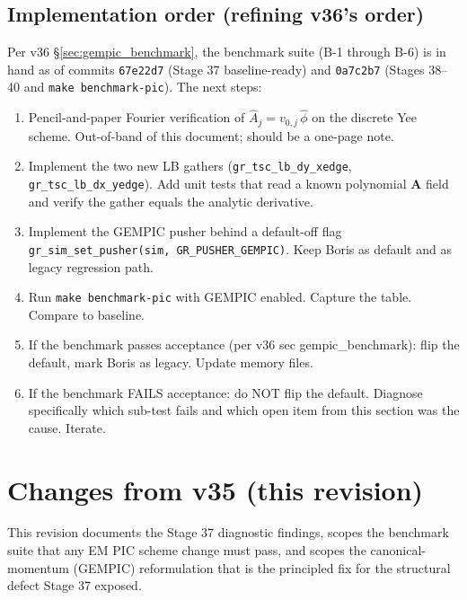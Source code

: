 \documentclass[11pt,a4paper]{article}
\newcommand{\vv}[1]{\mathbf{#1}}
\begin{document}
\subsection{Implementation order (refining v36's order)}

Per v36 §\ref{sec:gempic_benchmark}, the benchmark suite (B-1
through B-6) is in hand as of commits \texttt{67e22d7} (Stage 37
baseline-ready) and \texttt{0a7c2b7} (Stages 38--40 and
\texttt{make benchmark-pic}).  The next steps:

\begin{enumerate}
  \item Pencil-and-paper Fourier verification of
    $\hat{A}_j = v_{0,j}\,\hat{\phi}$ on the discrete Yee scheme.
    Out-of-band of this document; should be a one-page note.
  \item Implement the two new LB gathers
    (\texttt{gr\_tsc\_lb\_dy\_xedge},
    \texttt{gr\_tsc\_lb\_dx\_yedge}).
    Add unit tests that read a known polynomial $\vv{A}$ field and
    verify the gather equals the analytic derivative.
  \item Implement the GEMPIC pusher behind a default-off flag
    \texttt{gr\_sim\_set\_pusher(sim, GR\_PUSHER\_GEMPIC)}.
    Keep Boris as default and as legacy regression path.
  \item Run \texttt{make benchmark-pic} with GEMPIC enabled.
    Capture the table.  Compare to baseline.
  \item If the benchmark passes acceptance (per v36 sec
    gempic\_benchmark): flip the default, mark Boris as legacy.
    Update memory files.
  \item If the benchmark FAILS acceptance:
    do NOT flip the default.  Diagnose specifically which
    sub-test fails and which open item from this section was
    the cause.  Iterate.
\end{enumerate}

\newpage

\section*{Changes from v35 (this revision)}

This revision documents the Stage 37 diagnostic findings, scopes the
benchmark suite that any EM PIC scheme change must pass, and scopes
the canonical-momentum (GEMPIC) reformulation that is the principled
fix for the structural defect Stage 37 exposed.
\end{document}
